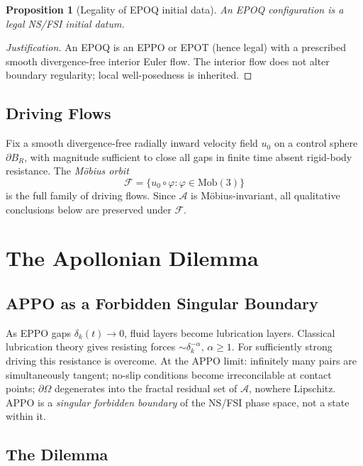 \documentclass[11pt]{article}
\theoremstyle{plain}
\newtheorem{proposition}[theorem]{Proposition}
\theoremstyle{definition}
\theoremstyle{remark}
\begin{document}
\begin{proposition}[Legality of EPOQ initial data]
An EPOQ configuration is a legal NS/FSI initial datum.
\end{proposition}

\begin{proof}[Justification]
An EPOQ is an EPPO or EPOT (hence legal) with a prescribed smooth
divergence-free interior Euler flow. The interior flow does not alter
boundary regularity; local well-posedness is inherited.
\end{proof}

\subsection{Driving Flows}

Fix a smooth divergence-free radially inward velocity field $u_0$ on a
control sphere $\partial B_R$, with magnitude sufficient to close all gaps
in finite time absent rigid-body resistance. The \emph{M\"{o}bius orbit}
\[
  \mathcal{F} = \{u_0 \circ \varphi : \varphi \in \mathrm{Mob}(3)\}
\]
is the full family of driving flows. Since $\mathcal{A}$ is
M\"{o}bius-invariant, all qualitative conclusions below are preserved
under $\mathcal{F}$.

\section{The Apollonian Dilemma}
\label{sec:dilemma}

\subsection{APPO as a Forbidden Singular Boundary}

As EPPO gaps $\delta_k(t) \to 0$, fluid layers become lubrication layers.
Classical lubrication theory gives resisting forces $\sim \delta_k^{-\alpha}$,
$\alpha \geq 1$. For sufficiently strong driving this resistance is overcome.
At the APPO limit: infinitely many pairs are simultaneously tangent; no-slip
conditions become irreconcilable at contact points; $\partial\Omega$
degenerates into the fractal residual set of $\mathcal{A}$, nowhere
Lipschitz. APPO is a \emph{singular forbidden boundary} of the NS/FSI phase
space, not a state within it.

\subsection{The Dilemma}
\end{document}

